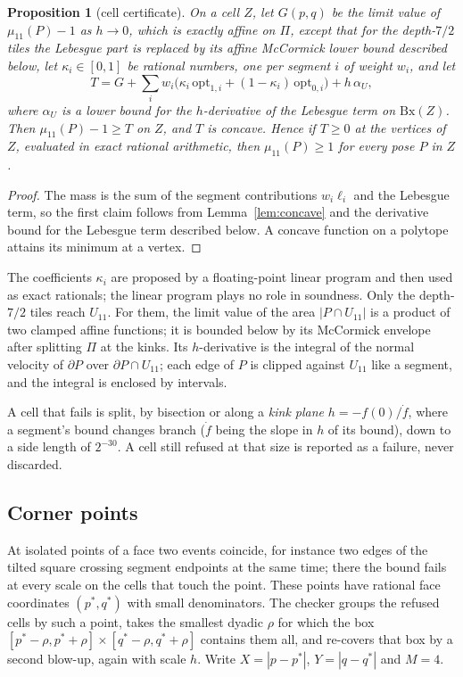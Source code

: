 \documentclass[11pt]{amsart}
\newtheorem{proposition}[theorem]{Proposition}
\theoremstyle{definition}
\theoremstyle{remark}
\newcommand{\opt}{\mathrm{opt}}
\begin{document}
\begin{proposition}[cell certificate]\label{prop:cell}
On a cell $Z$, let $G(p,q)$ be the limit value of $\mu_{11}(P)-1$ as $h\to0$, which is exactly affine on $\Pi$, except
that for the depth-$7/2$ tiles the Lebesgue part is replaced by its affine McCormick lower bound described below, let $\kappa_i\in[0,1]$ be
rational numbers, one per segment $i$ of weight $w_i$, and let
\[
T=G+\sum_i w_i\bigl(\kappa_i\,\opt_{1,i}+(1-\kappa_i)\,\opt_{0,i}\bigr)+h\,\alpha_U ,
\]
where $\alpha_U$ is a lower bound for the $h$-derivative of the Lebesgue term on $\mathrm{Bx}(Z)$. Then
$\mu_{11}(P)-1\ge T$ on $Z$, and $T$ is concave. Hence if $T\ge0$ at the vertices of $Z$, evaluated in exact
rational arithmetic, then $\mu_{11}(P)\ge1$ for every pose $P$ in $Z$.
\end{proposition}

\begin{proof}
The mass is the sum of the segment contributions $w_i\ell_i$ and the Lebesgue term, so the first claim follows from
Lemma~\ref{lem:concave} and the derivative bound for the Lebesgue term described below. A concave function on a
polytope attains its minimum at a vertex.
\end{proof}

The coefficients $\kappa_i$ are proposed by a floating-point linear program and then used as exact rationals; the
linear program plays no role in soundness. Only the depth-$7/2$ tiles reach $U_{11}$. For them, the limit value of
the area $|P\cap U_{11}|$ is a product of two clamped affine functions; it is bounded below by its McCormick
envelope after splitting $\Pi$ at the kinks. Its $h$-derivative is the integral of the normal velocity of $\partial P$
over $\partial P\cap U_{11}$; each edge of $P$ is clipped against $U_{11}$ like a segment, and the integral is enclosed
by intervals.

A cell that fails is split, by bisection or along a \emph{kink plane} $h=-f(0)/\dot f$, where a segment's bound changes
branch ($\dot f$ being the slope in $h$ of its bound), down to a side length of $2^{-30}$. A cell still refused at that size is
reported as a failure, never discarded.

\subsection{Corner points}
At isolated points of a face two events coincide, for instance two edges of the tilted square crossing segment
endpoints at the same time; there the bound fails at every scale on the cells that touch the point. These points
have rational face coordinates $(p^*,q^*)$ with small denominators. The checker groups the refused cells by such a point, takes the smallest dyadic
$\rho$ for which the box $[p^*-\rho,p^*+\rho]\times[q^*-\rho,q^*+\rho]$ contains them all, and re-covers that box
by a second blow-up, again with scale $h$. Write $X=|p-p^*|$, $Y=|q-q^*|$ and $M=4$.
\end{document}
